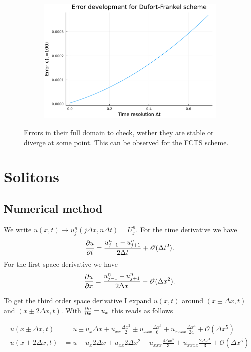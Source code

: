 \documentclass[
	a4paper, %
	10pt, %
]{CSUniSchoolLabReport}
\begin{document}
\begin{figure}[H]
\begin{subfigure}[b]{0.49\textwidth}
	\end{subfigure}
	\hfill
	\begin{subfigure}[b]{0.49\textwidth}
		\includegraphics[width=\textwidth]{../saves_t2/error_development_df.pdf}
	\end{subfigure}
	\hfill
	\caption{Errors in their full domain to check, wether they are stable or diverge at some point. This can be observed for the FCTS scheme.}
	\label{fig:all_trunc_errors}
\end{figure}


\section{Solitons}

\subsection{Numerical method}

We write $u(x,t)\rightarrow u_{j}^n (j\Delta x, n\Delta t) = U_j^n$. For the time derivative we have 
\begin{align}
	\pdv{u}{t} = \frac{u_{j-1}^n-u_{j+1}^n}{2\Delta t} + \mathscr{O}(\Delta t^2).
\end{align}
For the first space derivative we have
\begin{align}
	\pdv{u}{x} = \frac{u_{j-1}^n-u_{j+1}^n}{2\Delta x}+ \mathscr{O}(\Delta x^2).
\end{align}

To get the third order space derivative I expand $u(x,t)$ around $(x\pm\Delta x, t)$ and $(x\pm 2\Delta x, t)$. With $\pdv{u}{x} = u_x$ this reads as follows

\begin{align*}
	u(x\pm\Delta x, t) &= u \pm u_{x} \Delta x + u_{xx} \frac{\Delta x^2}{2}\pm u_{xxx} \frac{\Delta x^3}{6} + u_{xxxx}\frac{\Delta x^4}{24} + \mathscr{O}(\Delta x^5) \\
	u(x\pm 2\Delta x, t) &= u \pm u_{x} 2\Delta x + u_{xx} 2 \Delta x^2\pm u_{xxx} \frac{4\Delta x^3}{3} + u_{xxxx}\frac{2\Delta x^4}{3} + \mathscr{O}(\Delta x^5)
\end{align*}
\end{document}
